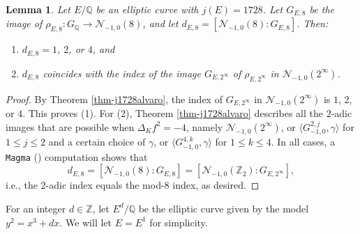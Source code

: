 \documentclass[11pt]{amsart}
\newtheorem{lemma}[defn]{Lemma}
\theoremstyle{definition}
\newcommand{\Q}{\mathbb Q}
\newcommand{\Z}{\mathbb Z}
\begin{document}
 

\begin{lemma}\label{lem-j1728index}
    Let $E/\Q$ be an elliptic curve with $j(E)=1728$. Let $G_{E,8}$ be the image of $\rho_{E,8}\colon G_\Q\to\mathcal{N}_{-1,0}(8)$, and let $d_{E,8}=[\mathcal{N}_{-1,0}(8):G_{E,8}]$. Then:
    \begin{enumerate}
        \item $d_{E,8}=1$, $2$, or $4$, and
        \item $d_{E,8}$ coincides with the index of the image $G_{E,2^\infty}$ of $\rho_{E,2^\infty}$ in $\mathcal{N}_{-1,0}(2^{\infty})$.
    \end{enumerate}
\end{lemma}
\begin{proof}
    By Theorem \ref{thm-j1728alvaro}, the index of $G_{E, 2^{\infty}}$ in $\mathcal{N}_{-1, 0}(2^{\infty})$ is $1$, $2$, or $4$. This proves (1). For (2), Theorem \ref{thm-j1728alvaro} describes all the $2$-adic images that are possible when $\Delta_K f^2=-4$, namely $\mathcal{N}_{-1,0}(2^{\infty})$, or $\langle G_{-1,0}^{2,j},\gamma \rangle$ for $1\leq j \leq 2$ and a certain choice of $\gamma$, or $\langle G_{-1,0}^{4,k},\gamma\rangle$ for $1\leq k\leq 4$. In all cases, a \verb|Magma| (\cite{magma}) computation shows that 
    $$d_{E,8}=[\mathcal{N}_{-1,0}(8):G_{E,8}]=[\mathcal{N}_{-1,0}(\Z_2):G_{E,2^\infty}],$$ i.e., the $2$-adic index equals the mod-$8$ index, as desired.
\end{proof}

For an integer $d\in\Z$, let $E^d/\Q$ be the elliptic curve given by the model $y^2=x^3+dx$. We will let $E=E^1$ for simplicity.
\end{document}
